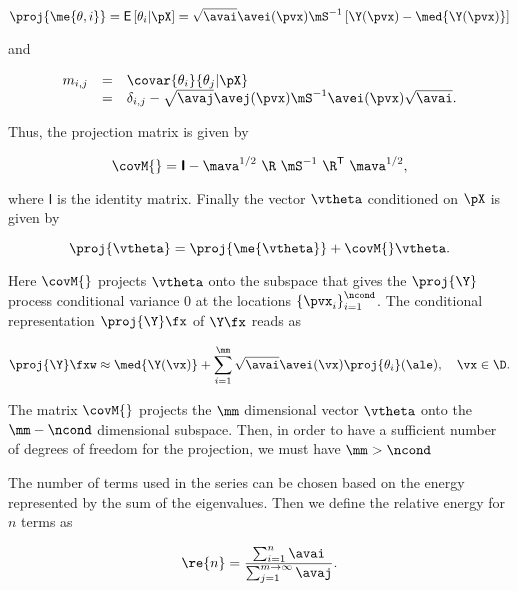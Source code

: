 \begin{equation}
 \proj{\me{\theta,i}} = \mathsf{E}\left[ \theta_{i} | \pX \right] = \sqrt{\avai}\avei(\pvx) \mS^{-1} \left[ \Y(\pvx) - \med{\Y(\pvx)} \right]
\end{equation}

\noindent and

\begin{equation}
 \begin{array}{rcl}
  m_{i,j} &=& \covar{\theta_{i}}{\theta_{j}|\pX}\\
          &=& \delta_{i,j} - \sqrt{\avaj}\avej(\pvx) \mS^{-1} \avei(\pvx)\sqrt{\avai}.
 \end{array}
\label{mmatrix}
\end{equation}

\noindent Thus, the projection matrix is given by

\begin{equation}
 \covM{} = \boldsymbol{\mathsf{I}} - \mava^{1/2}\ \R\ \mS^{-1}\ \R^{\mathsf{T}} \ \mava^{1/2},
\end{equation}

\noindent where $\boldsymbol{\mathsf{I}}$ is the identity matrix.
Finally the vector $\vtheta$ conditioned on $\pX$ is given by

\begin{equation}
 \proj{\vtheta} = \proj{\me{\vtheta}} + \covM{} \vtheta.
\end{equation}

\noindent Here $\covM{}$ projects $\vtheta$ onto the subspace that gives the $\proj{\Y}$ process conditional variance 0 at the locations $\left\{ \pvx_{i}\right\}_{i=1}^{\ncond}$.
The conditional representation $\proj{\Y}\fx$ of ${\Y\fx}$ reads as

\begin{equation}
  \proj{\Y}\fxw \approx \med{{\Y}(\vx)} +\sum_{i=1}^{\mm}\sqrt{\avai} \avei(\vx) \proj{\theta_{i}}(\ale),
  \quad \vx \in \D.
\label{klM}
\end{equation}

The matrix $\covM{}$ projects the $\mm$ dimensional vector $\vtheta$ onto the $\mm - \ncond$ dimensional subspace.
Then, in order to have a sufficient number of degrees of freedom for the projection, we must have $\mm > \ncond$

The number of terms used in the series can be chosen based on the energy represented by the sum of the eigenvalues. 
Then we define the relative energy for $n$ terms as

\begin{equation}
 \re{n} = \dfrac{\sum_{i=1}^{n}\avai}{\sum_{j=1}^{m\rightarrow\infty}\avaj}.
\end{equation}


